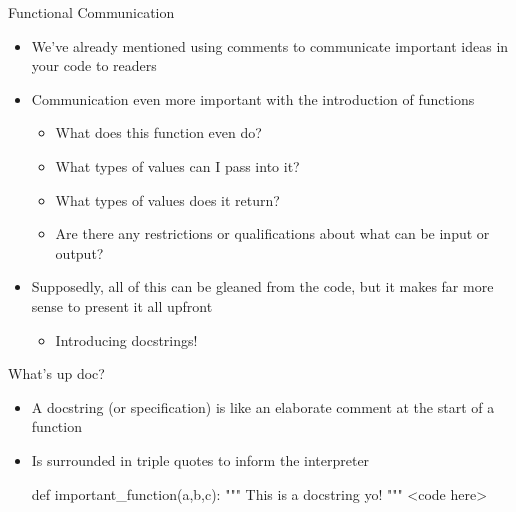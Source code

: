 \documentclass[pdf, aspectratio=169, 12pt]{beamer}
\begin{document}
\begin{frame}{Functional Communication}
	\begin{itemize}
		\item We've already mentioned using comments to communicate important ideas in your code to readers
		\item Communication even more important with the introduction of functions
			\begin{itemize}
				\item What does this function even do?
				\item What types of values can I pass into it?
				\item What types of values does it return?
				\item Are there any restrictions or qualifications about what can be input or output?
			\end{itemize}
		\item Supposedly, all of this can be gleaned from the code, but it makes far more sense to present it all upfront
			\begin{itemize}
				\item Introducing \alert{docstrings}!
			\end{itemize}
	\end{itemize}
\end{frame}

\begin{frame}[fragile]{What's up doc?}
	\begin{itemize}
		\item A docstring (or specification) is like an elaborate comment at the start of a function
		\item Is surrounded in triple quotes to inform the interpreter
			\begin{pythoncode}
				def important_function(a,b,c):
					""" This is a docstring yo! """
					<code here>
			\end{pythoncode}
	\end{itemize}
\end{frame}
\end{document}
